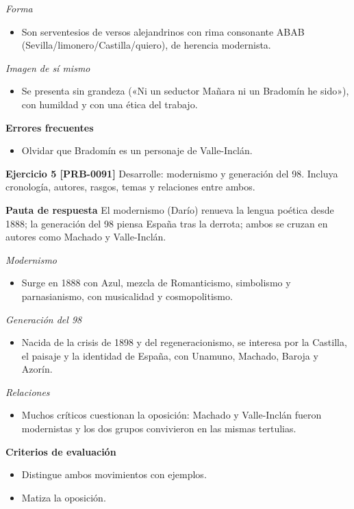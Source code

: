 \documentclass{book}
\begin{document}
\noindent\textit{Forma}
\begin{itemize}
\item Son serventesios de versos alejandrinos con rima consonante ABAB (Sevilla/limonero/Castilla/quiero), de herencia modernista.
\end{itemize}

\noindent\textit{Imagen de sí mismo}
\begin{itemize}
\item Se presenta sin grandeza («Ni un seductor Mañara ni un Bradomín he sido»), con humildad y con una ética del trabajo.
\end{itemize}

\noindent\textbf{Errores frecuentes}
\begin{itemize}
\item Olvidar que Bradomín es un personaje de Valle-Inclán.
\end{itemize}

\noindent\textbf{Ejercicio 5 [PRB-0091]}
Desarrolle: modernismo y generación del 98. Incluya cronología, autores, rasgos, temas y relaciones entre ambos.


\noindent\textbf{Pauta de respuesta}
El modernismo (Darío) renueva la lengua poética desde 1888; la generación del 98 piensa España tras la derrota; ambos se cruzan en autores como Machado y Valle-Inclán.


\noindent\textit{Modernismo}
\begin{itemize}
\item Surge en 1888 con Azul, mezcla de Romanticismo, simbolismo y parnasianismo, con musicalidad y cosmopolitismo.
\end{itemize}

\noindent\textit{Generación del 98}
\begin{itemize}
\item Nacida de la crisis de 1898 y del regeneracionismo, se interesa por la Castilla, el paisaje y la identidad de España, con Unamuno, Machado, Baroja y Azorín.
\end{itemize}

\noindent\textit{Relaciones}
\begin{itemize}
\item Muchos críticos cuestionan la oposición: Machado y Valle-Inclán fueron modernistas y los dos grupos convivieron en las mismas tertulias.
\end{itemize}

\noindent\textbf{Criterios de evaluación}
\begin{itemize}
\item Distingue ambos movimientos con ejemplos.
\item Matiza la oposición.
\end{itemize}
\end{document}
